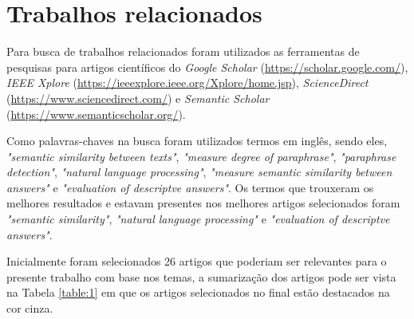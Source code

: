 \chapter{Trabalhos relacionados}

Para busca de trabalhos relacionados foram utilizados as ferramentas de pesquisas para artigos científicos do \textit{Google Scholar} (\url{https://scholar.google.com/}), \textit{IEEE Xplore} (\url{https://ieeexplore.ieee.org/Xplore/home.jsp}), \textit{ScienceDirect} (\url{https://www.sciencedirect.com/}) e \textit{Semantic Scholar} (\url{https://www.semanticscholar.org/}).

Como palavras-chaves na busca foram utilizados termos em inglês, sendo eles, \textit{"semantic similarity between texts"}, \textit{"measure degree of paraphrase"}, \textit{"paraphrase detection"}, \textit{"natural language processing"}, \textit{"measure semantic similarity between answers"} e \textit{"evaluation of descriptve answers"}. Os termos que trouxeram os melhores resultados e estavam presentes nos melhores artigos selecionados foram \textit{"semantic similarity"}, \textit{"natural language processing"} e \textit{"evaluation of descriptve answers"}.

Inicialmente foram selecionados 26 artigos que poderiam ser relevantes para o presente trabalho com base nos temas, a sumarização dos artigos pode ser vista na Tabela \ref{table:1} em que os artigos selecionados no final estão destacados na cor cinza.

